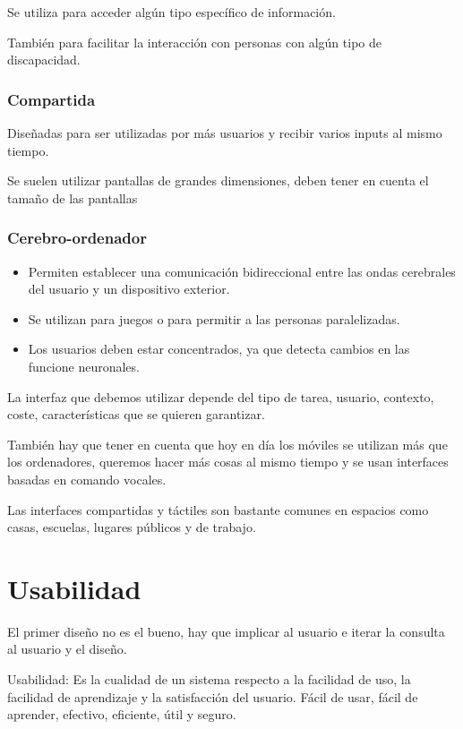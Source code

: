 \documentclass[12pt, twoside, openright]{report} %
\begin{document}
Se utiliza para acceder algún tipo específico de información.

También para facilitar la interacción con personas con algún
tipo de discapacidad.

\subsubsection{Compartida}
Diseñadas para ser utilizadas por más usuarios y recibir varios
inputs al mismo tiempo.

Se suelen utilizar pantallas de grandes dimensiones, deben tener
en cuenta el tamaño de las pantallas

\subsubsection{Cerebro-ordenador}

\begin{itemize}
	\item Permiten establecer una comunicación bidireccional entre las
	      ondas cerebrales del usuario y un dispositivo exterior.
	\item Se utilizan para juegos o para permitir a las personas
	      paralelizadas.
	\item Los usuarios deben estar concentrados, ya que detecta cambios en
	      las funcione neuronales.
\end{itemize}

La interfaz que debemos utilizar depende del tipo de tarea, usuario,
contexto, coste, características que se quieren garantizar.

También hay que tener en cuenta que hoy en día los móviles se
utilizan más que los ordenadores, queremos hacer más cosas al mismo
tiempo y se usan interfaces basadas en comando vocales.

Las interfaces compartidas y táctiles son bastante comunes en
espacios como casas, escuelas, lugares públicos y de trabajo.


\section{Usabilidad}

El primer diseño no es el bueno, hay que implicar al usuario e iterar
la consulta al usuario y el diseño.


Usabilidad: Es la cualidad de un sistema respecto a la facilidad de
uso, la facilidad de aprendizaje y la satisfacción del usuario.
Fácil de usar, fácil de aprender, efectivo, eficiente, útil y
seguro.
\end{document}
